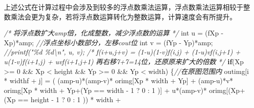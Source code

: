 \documentclass[
]{article}
\newenvironment{Shaded}{}{}
\newcommand{\CommentTok}[1]{\textcolor[rgb]{0.38,0.63,0.69}{\textit{#1}}}
\newcommand{\ControlFlowTok}[1]{\textcolor[rgb]{0.00,0.44,0.13}{\textbf{#1}}}
\newcommand{\DataTypeTok}[1]{\textcolor[rgb]{0.56,0.13,0.00}{#1}}
\newcommand{\DecValTok}[1]{\textcolor[rgb]{0.25,0.63,0.44}{#1}}
\newcommand{\NormalTok}[1]{#1}
\newcommand{\OperatorTok}[1]{\textcolor[rgb]{0.40,0.40,0.40}{#1}}
\begin{document}
上述公式在计算过程中会涉及到较多的浮点数乘法运算，浮点数乘法运算相较于整数乘法会更为复杂，若将浮点数运算转化为整数运算，计算速度会有所提升。

\begin{Shaded}
\begin{Highlighting}[]
\CommentTok{/*}
\CommentTok{将浮点数扩大amp倍，化成整数，减少浮点数的运算}
\CommentTok{ */}
\DataTypeTok{int}\NormalTok{ u }\OperatorTok{=} \OperatorTok{(}\NormalTok{fXp }\OperatorTok{{-}}\NormalTok{ Xp}\OperatorTok{)*}\NormalTok{amp}\OperatorTok{;} \CommentTok{//浮点坐标小数部分，左移cout位}
\DataTypeTok{int}\NormalTok{ v }\OperatorTok{=} \OperatorTok{(}\NormalTok{fYp }\OperatorTok{{-}}\NormalTok{ Yp}\OperatorTok{)*}\NormalTok{amp}\OperatorTok{;} 
\CommentTok{//printf("\%d \%d\textbackslash{}n", u, v);}
\CommentTok{/*}
\CommentTok{f(i+u,j+v) = (1{-}u)(1{-}v)f(i,j) + (1{-}u)vf(i,j+1) + u(1{-}v)f(i+1,j) + uvf(i+1,j+1)}
\CommentTok{再右移7+7=14位，还原原来扩大的倍数}
\CommentTok{ */}
\ControlFlowTok{if}\OperatorTok{(}\NormalTok{Xp }\OperatorTok{\textgreater{}=} \DecValTok{0} \OperatorTok{\&\&}\NormalTok{ Xp }\OperatorTok{\textless{}}\NormalTok{ height }\OperatorTok{\&\&}\NormalTok{ Yp }\OperatorTok{\textgreater{}=} \DecValTok{0} \OperatorTok{\&\&}\NormalTok{ Yp }\OperatorTok{\textless{}}\NormalTok{ width}\OperatorTok{)} \OperatorTok{\{}\CommentTok{//在原图范围内}
\NormalTok{  outimg}\OperatorTok{[}\NormalTok{i }\OperatorTok{*}\NormalTok{ widthf }\OperatorTok{+}\NormalTok{ j}\OperatorTok{]} \OperatorTok{=} \OperatorTok{(} \OperatorTok{(}\NormalTok{amp}\OperatorTok{{-}}\NormalTok{u}\OperatorTok{)*(}\NormalTok{amp}\OperatorTok{{-}}\NormalTok{v}\OperatorTok{)*}\NormalTok{   orimg}\OperatorTok{[}\NormalTok{Xp }\OperatorTok{*}\NormalTok{ width }\OperatorTok{+}\NormalTok{ Yp}\OperatorTok{]} \OperatorTok{+} 
                             \OperatorTok{(}\NormalTok{amp}\OperatorTok{{-}}\NormalTok{u}\OperatorTok{)*}\NormalTok{v}\OperatorTok{*}\NormalTok{  orimg}\OperatorTok{[}\NormalTok{Xp }\OperatorTok{*}\NormalTok{ width }\OperatorTok{+}\NormalTok{ Yp}\OperatorTok{+(}\NormalTok{Yp }\OperatorTok{==}\NormalTok{ width }\OperatorTok{{-}} \DecValTok{1} \OperatorTok{?} \DecValTok{0} \OperatorTok{:} \DecValTok{1} \OperatorTok{)]} \OperatorTok{+} 
\NormalTok{                             u}\OperatorTok{*(}\NormalTok{amp}\OperatorTok{{-}}\NormalTok{v}\OperatorTok{)*}\NormalTok{  orimg}\OperatorTok{[(}\NormalTok{Xp}\OperatorTok{+(}\NormalTok{Xp }\OperatorTok{==}\NormalTok{ height }\OperatorTok{{-}} \DecValTok{1} \OperatorTok{?} \DecValTok{0} \OperatorTok{:} \DecValTok{1} \OperatorTok{))} \OperatorTok{*}\NormalTok{ width }\OperatorTok{+} 

\end{Highlighting}
\end{Shaded}
\end{document}
